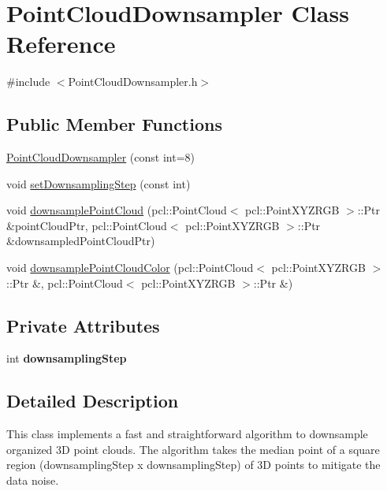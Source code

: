 \hypertarget{class_point_cloud_downsampler}{
\section{PointCloudDownsampler Class Reference}
\label{class_point_cloud_downsampler}
}


{\ttfamily \#include $<$PointCloudDownsampler.h$>$}

\subsection*{Public Member Functions}
\begin{DoxyCompactItemize}
\item 
\hyperlink{class_point_cloud_downsampler_a518e890b357eed74601e0fc940334343}{PointCloudDownsampler} (const int=8)
\item 
void \hyperlink{class_point_cloud_downsampler_aa59d5affe32288f96dd2ac1ff46aab35}{setDownsamplingStep} (const int)
\item 
void \hyperlink{class_point_cloud_downsampler_a0c868ad7dfe0c4e56b083312e91816af}{downsamplePointCloud} (pcl::PointCloud$<$ pcl::PointXYZRGB $>$::Ptr \&pointCloudPtr, pcl::PointCloud$<$ pcl::PointXYZRGB $>$::Ptr \&downsampledPointCloudPtr)
\item 
void \hyperlink{class_point_cloud_downsampler_ab47d1718a76090e2bc0b2d0a203f8e36}{downsamplePointCloudColor} (pcl::PointCloud$<$ pcl::PointXYZRGB $>$::Ptr \&, pcl::PointCloud$<$ pcl::PointXYZRGB $>$::Ptr \&)
\end{DoxyCompactItemize}
\subsection*{Private Attributes}
\begin{DoxyCompactItemize}
\item 
\hypertarget{class_point_cloud_downsampler_a74b48c9180a5d63ab550e26f07c24df0}{
int {\bfseries downsamplingStep}}
\label{class_point_cloud_downsampler_a74b48c9180a5d63ab550e26f07c24df0}

\end{DoxyCompactItemize}


\subsection{Detailed Description}
This class implements a fast and straightforward algorithm to downsample organized 3D point clouds. The algorithm takes the median point of a square region (downsamplingStep x downsamplingStep) of 3D points to mitigate the data noise. 

